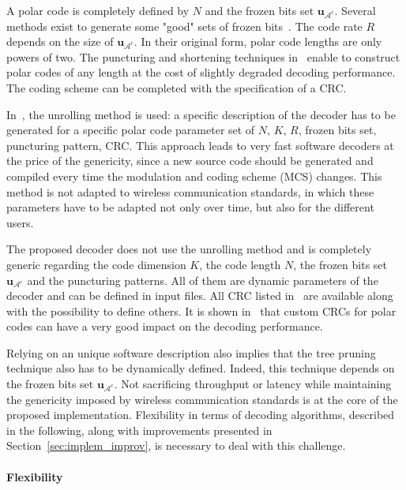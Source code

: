 A polar code is completely defined by $N$ and the frozen bits set
$\bm{u}_{\mathcal{A}^c}$. Several methods exist to generate some "good" sets of
frozen bits~\cite{Tal2013,Trifonov2012}. The code rate $R$ depends on the size
of $\bm{u}_{\mathcal{A}^c}$. In their original form, polar code lengths are only
powers of two. The puncturing and shortening techniques
in~\cite{Wang2014,Niu2013,Miloslavskaya2015} enable to construct polar codes of
any length at the cost of slightly degraded decoding performance. The coding
scheme can be completed with the specification of a CRC.

In~\cite{Sarkis2016}, the unrolling method is used: a specific description of
the decoder has to be generated for a specific polar code parameter set of $N$,
$K$, $R$, frozen bits set, puncturing pattern, CRC. This approach leads to very
fast software decoders at the price of the genericity, since a new source code
should be generated and compiled every time the modulation and coding scheme
(MCS) changes. This method is not adapted to wireless communication standards,
in which these parameters have to be adapted not only over time, but also for
the different users.

The proposed decoder does not use the unrolling method and is completely generic
regarding the code dimension $K$, the code length $N$, the frozen bits set
$\bm{u}_{\mathcal{A}^c}$ and the puncturing patterns. All of them are dynamic
parameters of the decoder and can be defined in input files. All CRC listed
in~\cite{CRCWiki2017} are available along with the possibility to define others.
It is shown in~\cite{Zhang2017} that custom CRCs for polar codes can have a very
good impact on the decoding performance.

Relying on an unique software description also implies that the tree pruning
technique also has to be dynamically defined. Indeed, this technique depends on
the frozen bits set $\bm{u}_{\mathcal{A}^c}$. Not sacrificing throughput or
latency while maintaining the genericity imposed by wireless communication
standards is at the core of the proposed implementation. Flexibility in terms of
decoding algorithms, described in the following, along with improvements
presented in Section~\ref{sec:implem_improv}, is necessary to deal with this
challenge.

\paragraph{Flexibility}


